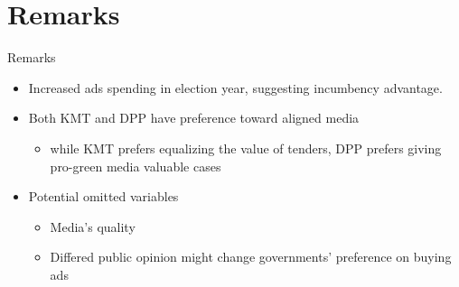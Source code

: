 \documentclass[
  10pt,
  ignorenonframetext,
  aspectratio=169,
]{beamer}
\providecommand{\tightlist}{%
  \setlength{\itemsep}{0pt}\setlength{\parskip}{0pt}}
\begin{document}
\begin{frame}

\end{frame}

\hypertarget{remarks}{%
\section{Remarks}\label{remarks}}

\begin{frame}{Remarks}
\begin{itemize}
\tightlist
\item
  Increased ads spending in election year, suggesting incumbency
  advantage.
\item
  Both KMT and DPP have preference toward aligned media

  \begin{itemize}
  \tightlist
  \item
    while KMT prefers equalizing the value of tenders, DPP prefers
    giving pro-green media valuable cases
  \end{itemize}
\item
  Potential omitted variables

  \begin{itemize}
  \tightlist
  \item
    Media's quality
  \item
    Differed public opinion might change governments' preference on
    buying ads
  \end{itemize}
\end{itemize}
\end{frame}
\end{document}
